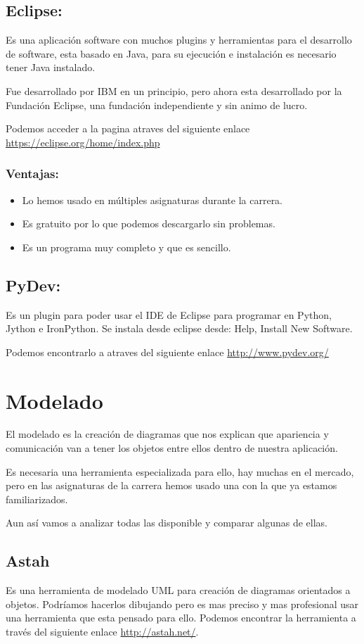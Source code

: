 \subsection{Eclipse:}
Es una aplicación software con muchos plugins y herramientas para el desarrollo de software, esta basado en Java, para su ejecución e instalación es necesario tener Java instalado.

Fue desarrollado por IBM en un principio, pero ahora esta desarrollado por la Fundación Eclipse, una fundación independiente y sin animo de lucro.


Podemos acceder a la pagina atraves del siguiente enlace  \url{https://eclipse.org/home/index.php}

\subsubsection{Ventajas:}
\begin{itemize}
	\item Lo hemos usado en múltiples asignaturas durante la carrera.
	\item Es gratuito por lo que podemos descargarlo sin problemas.
	\item Es un programa muy completo y que es sencillo.
\end{itemize}

\subsection{PyDev:}
Es un plugin para poder usar el IDE de Eclipse para programar en Python, Jython e IronPython.
Se instala desde eclipse desde: Help, Install New Software.

Podemos encontrarlo a atraves del siguiente enlace \url{http://www.pydev.org/}

\section{Modelado}
El modelado es la creación de diagramas que nos explican que apariencia y comunicación van a tener los objetos entre ellos dentro de nuestra aplicación.

Es necesaria una herramienta especializada para ello, hay muchas en el mercado, pero en las asignaturas de la carrera hemos usado una con la que ya estamos familiarizados.

Aun así vamos a analizar todas las disponible y comparar algunas de ellas.


\subsection{Astah}
Es una herramienta de modelado UML para creación de diagramas orientados a objetos.
Podríamos hacerlos dibujando pero es mas preciso y mas profesional usar una herramienta que esta pensado para ello.
Podemos encontrar la herramienta a través del siguiente enlace  
\url{http://astah.net/}.

